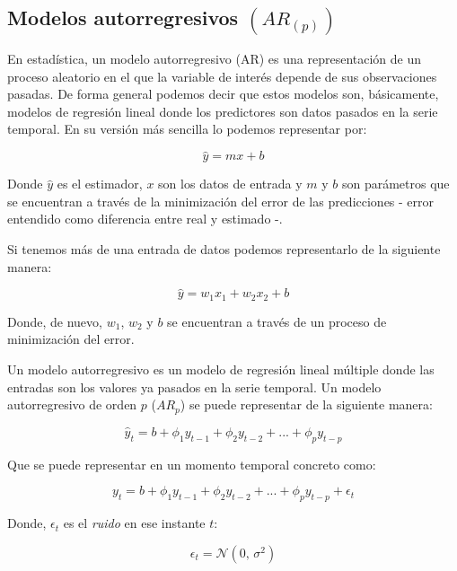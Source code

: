 \subsection{Modelos autorregresivos $(AR_{(p)})$}

En estadística, un modelo autorregresivo (AR) es una representación de un proceso aleatorio en el que la variable de interés depende de sus observaciones pasadas. De forma general podemos decir que estos modelos son, básicamente, modelos de regresión lineal donde los predictores son datos pasados en la serie temporal. En su versión más sencilla lo podemos representar por:

\begin{equation}
	\hat{y} = mx + b
\end{equation}

Donde $\hat{y}$ es el estimador, $x$ son los datos de entrada y $m$ y $b$ son parámetros que se encuentran a través de la minimización del error de las predicciones - error entendido como diferencia entre real y estimado -. 

Si tenemos más de una entrada de datos podemos representarlo de la siguiente manera:

\begin{equation}
	\hat{y} = w_{1}x_{1} + w_{2}x_{2} + b
\end{equation}

Donde, de nuevo, $w_{1}$, $w_{2}$ y $b$ se encuentran a través de un proceso de minimización del error. 

Un modelo autorregresivo es un modelo de regresión lineal múltiple donde las entradas son los valores ya pasados en la serie temporal. Un modelo autorregresivo de orden $p$ ($AR_{p}$) se puede representar de la siguiente manera:

\begin{equation}
	\hat{y}_{t} = b + \phi_{1}y_{t-1} + \phi_{2}y_{t-2} + ... + \phi_{p}y_{t-p}
\end{equation}

Que se puede representar en un momento temporal concreto como:

\begin{equation}
	y_{t} = b + \phi_{1}y_{t-1} + \phi_{2}y_{t-2} + ... + \phi_{p}y_{t-p} + \epsilon_{t}
\end{equation}

Donde, $\epsilon_{t}$ es el \emph{ruido} en ese instante $t$: 

\begin{equation}
	\epsilon_{t} = \mathcal{N}(0,\,\sigma^{2})
\end{equation}


